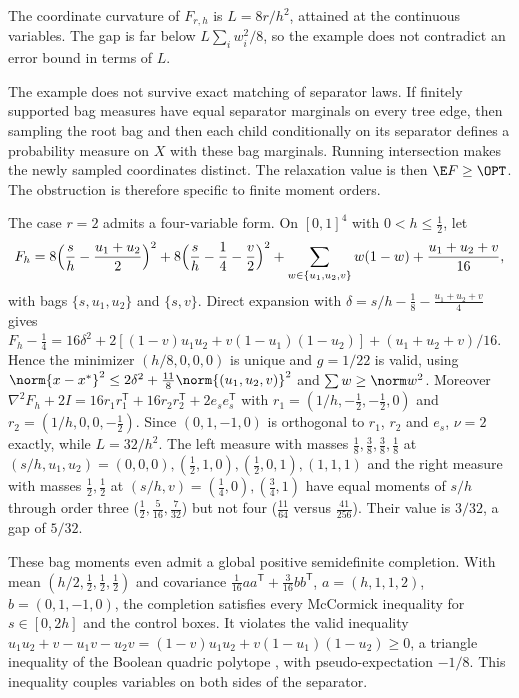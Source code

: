 \begin{remark}
\label{lim:rem:moments}
The coordinate curvature of $F_{r,h}$ is $L=8r/h^2$, attained at the continuous variables. The
gap is far below $L\sum_iw_i^2/8$, so the example does not contradict an
error bound in terms of $L$.

The example does not survive exact matching of separator laws. If finitely
supported bag measures have equal separator marginals on every tree edge,
then sampling the root bag and then each child conditionally on its separator
defines a probability measure on $X$ with these bag marginals. Running
intersection makes the newly sampled coordinates distinct. The relaxation
value is then $\E F\ge\OPT$. The obstruction is therefore specific to finite
moment orders.

The case $r=2$ admits a four-variable form. On $[0,1]^4$ with
$0<h\le\frac12$, let
\[
F_h=8\Bigl(\frac sh-\frac{u_1+u_2}2\Bigr)^2+8\Bigl(\frac sh-\frac14-\frac v2
\Bigr)^2+\sum_{w\in\{u_1,u_2,v\}}w(1-w)+\frac{u_1+u_2+v}{16},
\]
with bags $\{s,u_1,u_2\}$ and $\{s,v\}$. Direct expansion with
$\delta=s/h-\frac18-\frac{u_1+u_2+v}4$ gives
$F_h-\frac14=16\delta^2+2[(1-v)u_1u_2+v(1-u_1)(1-u_2)]+(u_1+u_2+v)/16$.
Hence the minimizer $(h/8,0,0,0)$ is unique and $g=1/22$ is valid, using
$\norm{x-x^*}^2\le2\delta^2+\frac{11}8\norm{(u_1,u_2,v)}^2$ and
$\sum w\ge\norm w^2$. Moreover $\nabla^2F_h+2I=16r_1r_1^{\mathsf T}+
16r_2r_2^{\mathsf T}+2e_se_s^{\mathsf T}$ with $r_1=(1/h,-\frac12,-\frac12,0)$
and $r_2=(1/h,0,0,-\frac12)$. Since $(0,1,-1,0)$ is orthogonal to $r_1$, $r_2$
and $e_s$, $\nu=2$ exactly, while $L=32/h^2$. The left measure with masses
$\frac18,\frac38,\frac38,\frac18$ at $(s/h,u_1,u_2)=(0,0,0),(\frac12,1,0),
(\frac12,0,1),(1,1,1)$ and the right measure with masses $\frac12,\frac12$
at $(s/h,v)=(\frac14,0),(\frac34,1)$ have equal moments of $s/h$ through order
three ($\frac12,\frac5{16},\frac7{32}$) but not four ($\frac{11}{64}$ versus
$\frac{41}{256}$). Their value is $3/32$, a gap of $5/32$.

These bag moments even admit a global positive semidefinite completion.
With mean $(h/2,\frac12,\frac12,\frac12)$ and covariance
$\frac1{16}aa^{\mathsf T}+\frac3{16}bb^{\mathsf T}$, $a=(h,1,1,2)$,
$b=(0,1,-1,0)$, the completion satisfies every McCormick inequality for
$s\in[0,2h]$ and the control boxes. It violates the valid inequality
$u_1u_2+v-u_1v-u_2v=(1-v)u_1u_2+v(1-u_1)(1-u_2)\ge0$, a triangle inequality
of the Boolean quadric polytope \cite{Padberg1989}, with pseudo-expectation
$-1/8$. This inequality couples variables on both sides of the separator.
\end{remark}

